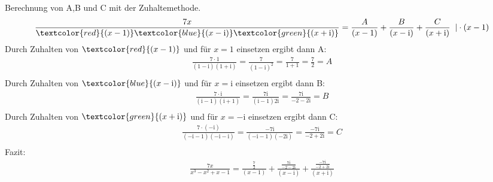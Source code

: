 Berechnung von A,B und C mit der Zuhaltemethode.\\
\begin{align*}
\frac{7x}{\textcolor{red}{(x-1)}\textcolor{blue}{(x-\mathrm{i})}\textcolor{green}{(x+\mathrm{i})}}&=\frac{A}{(x-1)}+\frac{B}{(x-\mathrm{i})}+\frac{C}{(x+\mathrm{i})}\;\;|\cdot (x-1)\\
\end{align*}
Durch Zuhalten von $ \textcolor{red}{(x-1)} $ und für $ x=1 $ einsetzen ergibt dann A:\\
\begin{align*}
\frac{7\cdot1}{(1-\mathrm{i})(1+\mathrm{i})}=\frac{7}{(1-\mathrm{i})^2}=\frac{7}{1+1}=\frac{7}{2}=A\\
\end{align*}
Durch Zuhalten von $ \textcolor{blue}{(x-\mathrm{i})} $ und für $ x=\mathrm{i} $ einsetzen ergibt dann B:\\
\begin{align*}
\frac{7\cdot \mathrm{i}}{(\mathrm{i}-1)(\mathrm{i}+1)}=\frac{7\mathrm{i}}{(\mathrm{i}-1)2\mathrm{i}}=\frac{7\mathrm{i}}{-2-2\mathrm{i}}=B\\
\end{align*}
Durch Zuhalten von $ \textcolor{green}{(x+\mathrm{i})} $ und für $ x=-\mathrm{i} $ einsetzen ergibt dann C:\\
\begin{align*}
\frac{7\cdot(-\mathrm{i})}{(-\mathrm{i}-1)(-\mathrm{i}-\mathrm{i})}=\frac{-7\mathrm{i}}{(-\mathrm{i}-1)(-2\mathrm{i})}=\frac{-7\mathrm{i}}{-2+2\mathrm{i}}=C\\
\end{align*}
Fazit:\\
\begin{align*}
\frac{7x}{x^3-x^2+x-1}=\frac{\frac{7}{2}}{(x-1)}+\frac{\frac{7\mathrm{i}}{-2-2\mathrm{i}}}{(x-\mathrm{i})}+\frac{\frac{-7\mathrm{i}}{-2+2\mathrm{i}}}{(x+\mathrm{i})}\\
\end{align*}

